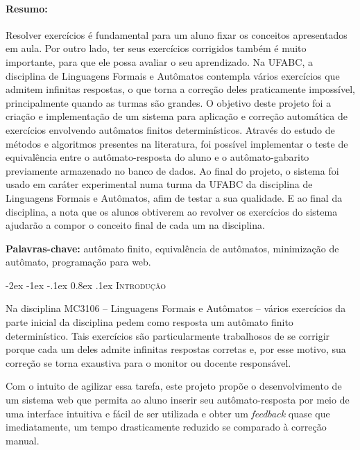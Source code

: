 \documentclass[plainsections,  24pt]{sciposter} %
\makeatletter
\newcommand{\largo}{\fontsize{36}{40}\selectfont } %
\renewcommand\section{\@startsection {section}{1}{\z@}%
                                   {-2ex \@plus -1ex \@minus -.1ex}%
                                   {0.8ex \@plus.1ex}%
                                   {\normalfont\largo\bfseries}}
\makeatother
\begin{document}
\vspace{1.2cm}
\begin{multicols}{2}
  
\paragraph{Resumo:}
  Resolver exercícios é fundamental para um aluno fixar os conceitos apresentados em aula. Por outro lado, ter seus exercícios corrigidos também é muito importante, para que ele possa avaliar o seu aprendizado. Na UFABC, a disciplina de Linguagens Formais e Autômatos contempla vários exercícios que admitem infinitas respostas, o que torna a correção deles praticamente impossível, principalmente quando as turmas são grandes. O objetivo deste projeto foi a criação e implementação de um sistema para aplicação e correção automática de exercícios envolvendo autômatos finitos determinísticos. Através do estudo de métodos e algoritmos presentes na literatura, foi possível implementar o teste de equivalência entre o autômato-resposta do aluno e o autômato-gabarito previamente armazenado no banco de dados. Ao final do projeto, o sistema foi usado em caráter experimental numa turma da UFABC da disciplina de Linguagens Formais e Autômatos, afim de testar a sua qualidade. E ao final da disciplina, a nota que os alunos obtiverem ao revolver os exercícios do sistema ajudarão a compor o conceito final de cada um na disciplina.

  \noindent \textbf{Palavras-chave:} autômato finito, equivalência de autômatos, minimização de autômato, programação para web.

\section{\textsc{Introdução}}

Na disciplina MC3106 – Linguagens Formais e Autômatos – vários exercícios da parte inicial da disciplina pedem como resposta um autômato finito determinístico. Tais exercícios são particularmente trabalhosos de se corrigir porque cada um deles admite infinitas respostas corretas e, por esse motivo, sua correção se torna exaustiva para o monitor ou docente responsável.

Com o intuito de agilizar essa tarefa, este projeto propõe o desenvolvimento de um sistema web que permita ao aluno inserir seu autômato-resposta por meio de uma interface intuitiva e fácil de ser utilizada e obter um \textit{feedback} quase que imediatamente, um tempo drasticamente reduzido se comparado à correção manual. 


\end{multicols}
\end{document}
